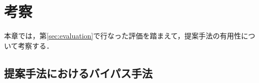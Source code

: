 \section{考察}
本章では，第\ref{sec:evaluation}で行なった評価を踏まえて，提案手法の有用性について考察する．
% 
\subsection{提案手法におけるバイパス手法}


